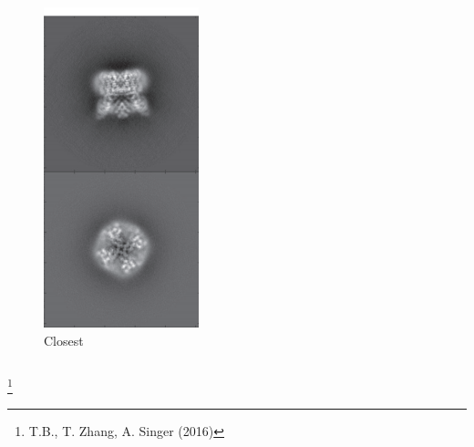\documentclass{beamer}
\newcommand\blfootnote[1]{%
  \begingroup
  \renewcommand\thefootnote{}\footnote{#1}%
  \addtocounter{footnote}{-1}%
  \endgroup
}
\begin{document}
\begin{frame}
\begin{columns}
\begin{figure}
\centering
\includegraphics[width=.8 \columnwidth]{figures/deneg_clean.png}
\caption{Closest}
\end{figure}
\end{columns}
\blfootnote{T.B., T. Zhang, A. Singer (2016)}
\end{frame}
\end{document}
